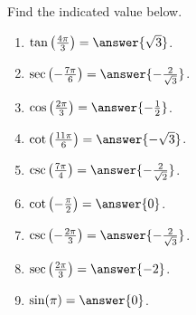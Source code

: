 \documentclass{ximera}
\author{Kenneth Berglund}
\begin{document}
\begin{exercise}
Find the indicated value below.

\begin{enumerate}
\item $\tan\left(\frac{4\pi}{3}\right) = \answer{\sqrt{3}}$.

\item $\sec\left(-\frac{7\pi}{6}\right) = \answer{-\frac{2}{\sqrt{3}}}$.

\item $\cos\left(\frac{2\pi}{3}\right) = \answer{-\frac{1}{2}}$.

\item $\cot\left(\frac{11\pi}{6}\right) = \answer{-\sqrt{3}}$.

\item $\csc\left(\frac{7\pi}{4}\right) = \answer{-\frac{2}{\sqrt{2}}}$.

\item $\cot\left(-\frac{\pi}{2}\right) = \answer{0}$.

\item $\csc\left(-\frac{2\pi}{3}\right) = \answer{-\frac{2}{\sqrt{3}}}$.

\item $\sec\left(\frac{2\pi}{3}\right) = \answer{-2}$.

\item $\sin(\pi) = \answer{0}$.
\end{enumerate}

\end{exercise}
\end{document}

